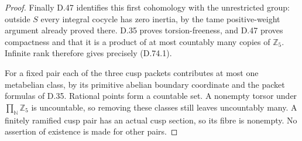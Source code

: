\begin{proof}
Finally D.47 identifies this first cohomology with
the unrestricted group: outside \(S\) every integral
cocycle has zero inertia, by the tame positive-weight
argument already proved there. D.35 proves
torsion-freeness, and D.47 proves compactness and
that it is a product of at most countably many
copies of \(\mathbb Z_5\). Infinite rank therefore
gives precisely (D.74.1).

For a fixed pair each of the three cusp packets
contributes at most one metabelian class, by its
primitive abelian boundary coordinate and the
packet formulas of D.35. Rational points form a
countable set. A nonempty torsor under
\(\prod_{\mathbb N}\mathbb Z_5\) is uncountable,
so removing these classes still leaves uncountably
many. A finitely ramified cusp pair has an actual
cusp section, so its fibre is nonempty. No assertion
of existence is made for other pairs.
\end{proof}
